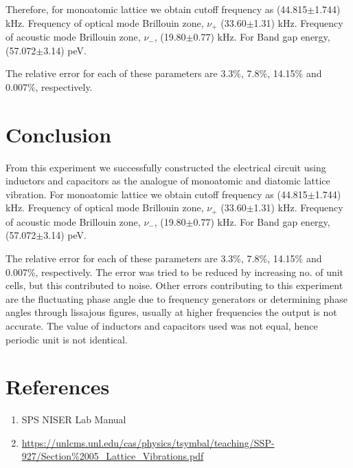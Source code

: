 \documentclass[a4paper, amsfonts, amssymb, amsmath, reprint, showkeys, nofootinbib, twoside]{revtex4-1}
\begin{document}
Therefore, for monoatomic lattice we obtain cutoff frequency as (44.815$\pm$1.744) kHz. Frequency of optical mode Brillouin zone, $\nu_+$ (33.60$\pm$1.31) kHz. Frequency of acoustic mode Brillouin zone, $\nu_-$, (19.80$\pm$0.77) kHz. For Band gap energy, (57.072$\pm$3.14) peV. 

The relative error for each of these parameters are 3.3\%, 7.8\%, 14.15\% and 0.007\%, respectively.

\section{Conclusion}
From this experiment we successfully constructed the electrical circuit using inductors and capacitors as the analogue of monoatomic and diatomic lattice vibration. For monoatomic lattice we obtain cutoff frequency as (44.815$\pm$1.744) kHz. Frequency of optical mode Brillouin zone, $\nu_+$ (33.60$\pm$1.31) kHz. Frequency of acoustic mode Brillouin zone, $\nu_-$, (19.80$\pm$0.77) kHz. For Band gap energy, (57.072$\pm$3.14) peV. 

The relative error for each of these parameters are 3.3\%, 7.8\%, 14.15\% and 0.007\%, respectively. The error was tried to be reduced by increasing no. of unit cells, but this contributed to noise. Other errors contributing to this experiment are the fluctuating phase angle due to frequency generators or determining phase angles through lissajous figures, usually at higher frequencies the output is not accurate. The value of  inductors and capacitors used was not equal, hence periodic unit is not identical. 

\section{References}
\begin{enumerate}
\item{SPS NISER Lab Manual}
\item{\url{https://unlcms.unl.edu/cas/physics/tsymbal/teaching/SSP-927/Section%2005_Lattice_Vibrations.pdf}}
\end{enumerate}
\end{document}

